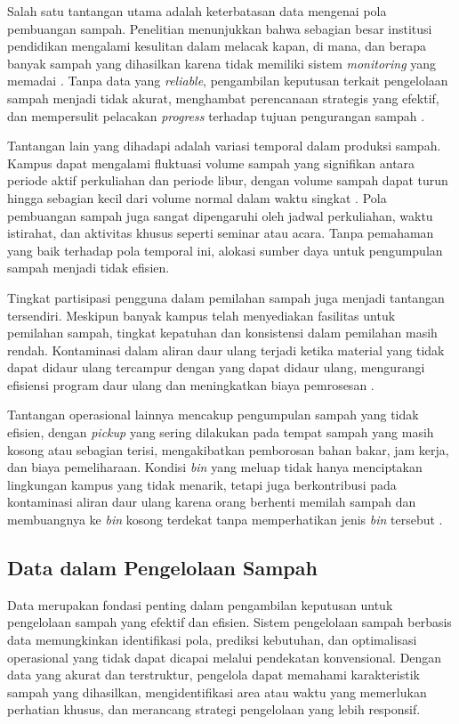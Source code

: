 Salah satu tantangan utama adalah keterbatasan data mengenai pola pembuangan sampah. Penelitian menunjukkan bahwa sebagian besar institusi pendidikan mengalami kesulitan dalam melacak kapan, di mana, dan berapa banyak sampah yang dihasilkan karena tidak memiliki sistem \textit{monitoring} yang memadai \autocite{bahcelioglu2020}. Tanpa data yang \textit{reliable}, pengambilan keputusan terkait pengelolaan sampah menjadi tidak akurat, menghambat perencanaan strategis yang efektif, dan mempersulit pelacakan \textit{progress} terhadap tujuan pengurangan sampah \autocite{sensoneo2024}.

Tantangan lain yang dihadapi adalah variasi temporal dalam produksi sampah. Kampus dapat mengalami fluktuasi volume sampah yang signifikan antara periode aktif perkuliahan dan periode libur, dengan volume sampah dapat turun hingga sebagian kecil dari volume normal dalam waktu singkat \autocite{roadrunner2024}. Pola pembuangan sampah juga sangat dipengaruhi oleh jadwal perkuliahan, waktu istirahat, dan aktivitas khusus seperti seminar atau acara. Tanpa pemahaman yang baik terhadap pola temporal ini, alokasi sumber daya untuk pengumpulan sampah menjadi tidak efisien.

Tingkat partisipasi pengguna dalam pemilahan sampah juga menjadi tantangan tersendiri. Meskipun banyak kampus telah menyediakan fasilitas untuk pemilahan sampah, tingkat kepatuhan dan konsistensi dalam pemilahan masih rendah. Kontaminasi dalam aliran daur ulang terjadi ketika material yang tidak dapat didaur ulang tercampur dengan yang dapat didaur ulang, mengurangi efisiensi program daur ulang dan meningkatkan biaya pemrosesan \autocite{sensoneo2024}.

Tantangan operasional lainnya mencakup pengumpulan sampah yang tidak efisien, dengan \textit{pickup} yang sering dilakukan pada tempat sampah yang masih kosong atau sebagian terisi, mengakibatkan pemborosan bahan bakar, jam kerja, dan biaya pemeliharaan. Kondisi \textit{bin} yang meluap tidak hanya menciptakan lingkungan kampus yang tidak menarik, tetapi juga berkontribusi pada kontaminasi aliran daur ulang karena orang berhenti memilah sampah dan membuangnya ke \textit{bin} kosong terdekat tanpa memperhatikan jenis \textit{bin} tersebut \autocite{sensoneo2024}.

\subsection{Data dalam Pengelolaan Sampah}

Data merupakan fondasi penting dalam pengambilan keputusan untuk pengelolaan sampah yang efektif dan efisien. Sistem pengelolaan sampah berbasis data memungkinkan identifikasi pola, prediksi kebutuhan, dan optimalisasi operasional yang tidak dapat dicapai melalui pendekatan konvensional. Dengan data yang akurat dan terstruktur, pengelola dapat memahami karakteristik sampah yang dihasilkan, mengidentifikasi area atau waktu yang memerlukan perhatian khusus, dan merancang strategi pengelolaan yang lebih responsif.

